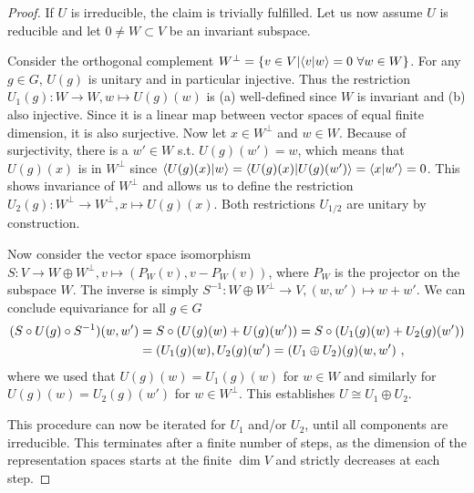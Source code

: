 \begin{proof}
    If $U$ is irreducible, the claim is trivially fulfilled.
    Let us now assume $U$ is reducible and let $0 \neq W \subset V$ be an invariant subspace.
    
    Consider the orthogonal complement $W^\perp = \setdef{v \in V}{\braket{v}{w} = 0 ~\forall w \in W}$.
    For any $g\in G$, $U(g)$ is unitary and in particular injective.
    Thus the restriction $U_1(g): W \to W, w \mapsto U(g)(w)$ is (a) well-defined since $W$ is invariant and (b) also injective.
    Since it is a linear map between vector spaces of equal finite dimension, it is also surjective.
    Now let $x \in W^\perp$ and $w \in W$.
    Because of surjectivity, there is a $w' \in W$ s.t. $U(g)(w') = w$, which means that $U(g)(x)$ is in $W^\perp$ since $\braket{U(g)(x)}{w} = \braket{U(g)(x)}{U(g)(w')} = \braket{x}{w'} = 0$.
    This shows invariance of $W^\perp$ and allows us to define the restriction $U_2(g): W^\perp \to W^\perp , x \mapsto U(g)(x)$.
    Both restrictions $U_{1/2}$ are unitary by construction.

    Now consider the vector space isomorphism $S: V \to W \oplus W^\perp, v \mapsto (P_W(v), v - P_W(v))$, where $P_W$ is the projector on the subspace $W$.
    The inverse is simply $S^{-1} : W \oplus W^\perp \to V , (w, w') \mapsto w + w'$.
    We can conclude equivariance for all $g\in G$
    \begin{align}
        \begin{split}
            (S \circ U(g) \circ S^{-1})(w, w')
            &= S \circ (U(g)(w) + U(g)(w'))
            = S \circ (U_1(g)(w) + U_2(g)(w'))
            \\
            &= (U_1(g)(w), U_2(g)(w')
            = (U_1 \oplus U_2)(g)(w, w')
            ~,
        \end{split}
    \end{align}
    where we used that $U(g)(w) = U_1(g)(w)$ for $w \in W$ and similarly for $U(g)(w) = U_2(g)(w')$ for $w \in W^\perp$. This establishes $U \cong U_1 \oplus U_2$.

    This procedure can now be iterated for $U_1$ and/or $U_2$, until all components are irreducible.
    This terminates after a finite number of steps, as the dimension of the representation spaces starts at the finite $\dim V$ and strictly decreases at each step.
\end{proof}

